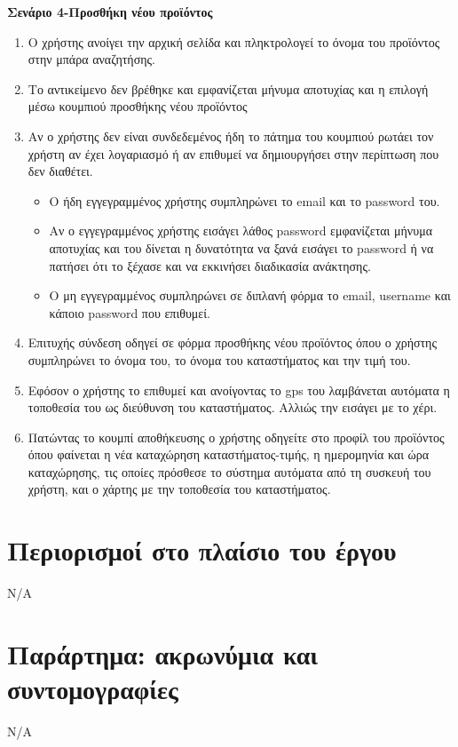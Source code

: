 \documentclass[12pt, oneside, a4paper]{report}
\begin{document}
\vspace{0.5cm}
\textbf{Σενάριο 4-Προσθήκη νέου προϊόντος}\\
\begin{enumerate}
 \item Ο χρήστης ανοίγει την αρχική σελίδα και πληκτρολογεί το όνομα του προϊόντος στην μπάρα αναζητήσης.
 \item Το αντικείμενο δεν βρέθηκε και εμφανίζεται μήνυμα αποτυχίας και η επιλογή μέσω κουμπιού προσθήκης νέου προϊόντος
 \item Αν ο χρήστης δεν είναι συνδεδεμένος ήδη το πάτημα του κουμπιού ρωτάει τον χρήστη αν έχει λογαριασμό ή αν επιθυμεί να δημιουργήσει στην περίπτωση που δεν διαθέτει.
 \begin{itemize}
  \item Ο ήδη εγγεγραμμένος χρήστης συμπληρώνει το email και το password του.
  \item Αν ο εγγεγραμμένος χρήστης εισάγει λάθος password εμφανίζεται μήνυμα αποτυχίας και του δίνεται η  δυνατότητα να ξανά εισάγει το password ή να πατήσει ότι το ξέχασε και να εκκινήσει διαδικασία ανάκτησης.
  \item O μη εγγεγραμμένος συμπληρώνει σε διπλανή φόρμα το email, username και κάποιο password που επιθυμεί.
 \end{itemize}
 \item Επιτυχής σύνδεση οδηγεί σε φόρμα προσθήκης νέου προϊόντος όπου ο χρήστης συμπληρώνει το όνομα του, το όνομα του καταστήματος και την τιμή του.
 \item Εφόσον ο χρήστης το επιθυμεί και ανοίγοντας το gps του λαμβάνεται αυτόματα η τοποθεσία του ως διεύθυνση του καταστήματος. Αλλιώς την εισάγει με το χέρι.
 \item Πατώντας το κουμπί αποθήκευσης ο χρήστης οδηγείτε στο προφίλ του προϊόντος όπου φαίνεται η νέα καταχώρηση καταστήματος-τιμής, η ημερομηνία και ώρα καταχώρησης, τις οποίες πρόσθεσε το σύστημα αυτόματα από τη συσκευή του χρήστη, και ο χάρτης με την τοποθεσία του καταστήματος.
\end{enumerate}


\section{Περιορισμοί στο πλαίσιο του έργου}
N/A

\section{Παράρτημα: ακρωνύμια και συντομογραφίες}
N/A
\end{document}
